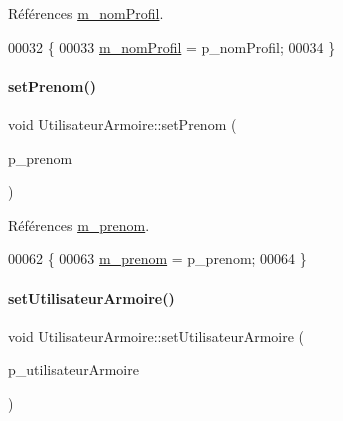 Références \hyperlink{class_utilisateur_armoire_a470f47c105d9b3124c8d284b164a443d}{m\+\_\+nom\+Profil}.


\begin{DoxyCode}
00032 \{
00033     \hyperlink{class_utilisateur_armoire_a470f47c105d9b3124c8d284b164a443d}{m\_nomProfil} = p\_nomProfil;
00034 \}
\end{DoxyCode}
\mbox{\label{class_utilisateur_armoire_a26a7087617a276ff5c4e349bda5fed5a}} 
\paragraph{\texorpdfstring{set\+Prenom()}{setPrenom()}}
{\footnotesize\ttfamily void Utilisateur\+Armoire\+::set\+Prenom (\begin{DoxyParamCaption}\item[{Q\+String}]{p\+\_\+prenom }\end{DoxyParamCaption})}



Références \hyperlink{class_utilisateur_armoire_a652d7a57ec09963d16ab82838a5ffc51}{m\+\_\+prenom}.


\begin{DoxyCode}
00062 \{
00063     \hyperlink{class_utilisateur_armoire_a652d7a57ec09963d16ab82838a5ffc51}{m\_prenom} = p\_prenom;
00064 \}
\end{DoxyCode}
\mbox{\label{class_utilisateur_armoire_a523423ac9e15b8260ca7f5ffc84c008d}} 
\paragraph{\texorpdfstring{set\+Utilisateur\+Armoire()}{setUtilisateurArmoire()}}
{\footnotesize\ttfamily void Utilisateur\+Armoire\+::set\+Utilisateur\+Armoire (\begin{DoxyParamCaption}\item[{Q\+String\+List}]{p\+\_\+utilisateur\+Armoire }\end{DoxyParamCaption})}



